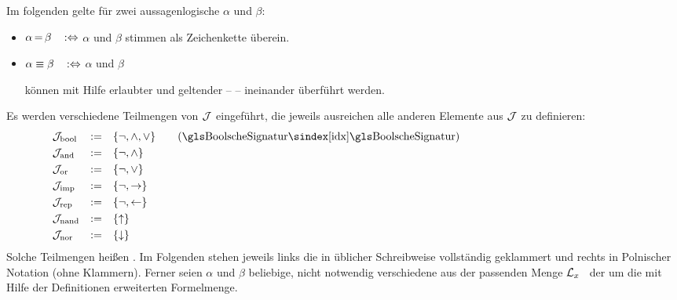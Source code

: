 Im folgenden gelte für zwei aussagenlogische  $\alpha$ und $\beta$:
\begin{itemize}
	\item[] $\alpha \operatorname{=}    \beta \quad \operatorname{:\!\operatorname{\Leftrightarrow}}$ \quad $\alpha$ und $\beta$
	stimmen als Zeichenkette überein.
	\item[] $\alpha \equiv \beta \quad \operatorname{:\!\operatorname{\Leftrightarrow}}$ \quad $\alpha$ und $\beta$
	\parbox[t]{11cm}{können mit Hilfe erlaubter  und geltender  --  -- ineinander überführt werden.}
\end{itemize}
%
Es werden verschiedene Teilmengen von $\mathcal{J}$ eingeführt, die jeweils ausreichen alle anderen Elemente aus $\mathcal{J}$ zu definieren:
\begin{align}
	& \alJun_\xBool & \defeq & \quad\{ \lnot, \land, \lor \} \label{def:Jbool}
	\qquad (\text{\glsIdx{BoolscheSignatur}})
	\\
	& \alJun_\xAnd  & \defeq & \quad\{ \lnot, \land       \} \label{def:Jand}
	\\
	& \alJun_\xOr   & \defeq & \quad\{ \lnot, \lor        \} \label{def:Jor}
	\\
	& \alJun_\xImp  & \defeq & \quad\{ \lnot, \limp       \} \label{def:Jimp}
	\\
	& \alJun_\xRep  & \defeq & \quad\{ \lnot, \lrep       \} \label{def:Jrep}
	\\
	& \alJun_\xNand & \defeq & \quad\{ \lnand             \} \label{def:Jnand}
	\\
	& \alJun_\xNor  & \defeq & \quad\{ \lnor              \} \label{def:Jnor}
	\formulatoleft\formulatoleft\formulatoleft
\end{align}
Solche Teilmengen heißen .
%
Im Folgenden stehen jeweils links die  in üblicher Schreibweise vollständig geklammert und rechts in Polnischer Notation (ohne Klammern).
Ferner seien $\alpha$ und $\beta$ beliebige, nicht notwendig verschiedene  aus der passenden Menge $\mathcal{L}_x$ \textbzgl\ der um die mit Hilfe der Definitionen erweiterten Formelmenge.

